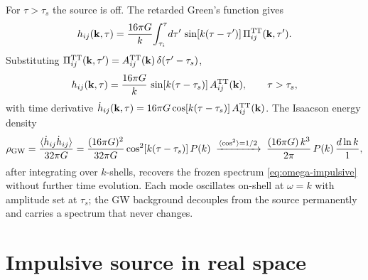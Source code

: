 \documentclass[10pt,prd,aps,nobibnotes,superscriptaddress,preprintnumbers,notitlepage]{revtex4-1}
\newcommand{\kb}{{\bf k}}
\begin{document}
For $\tau>\tau_s$ the source is off. The retarded Green's function gives
\begin{equation}
  h_{ij}(\kb,\tau)
  = \frac{16\pi G}{k}\!\int_{\tau_i}^{\tau}\!d\tau'\,
    \sin[k(\tau-\tau')]\,\Pi^{\rm TT}_{ij}(\kb,\tau').
  \label{eq:greens-impulsive}
\end{equation}
Substituting $\Pi^{\rm TT}_{ij}(\kb,\tau')=A^{\rm TT}_{ij}(\kb)\,\delta(\tau'-\tau_s)$,
\begin{equation}
  h_{ij}(\kb,\tau) = \frac{16\pi G}{k}\,\sin[k(\tau-\tau_s)]\,A^{\rm TT}_{ij}(\kb),
  \qquad \tau>\tau_s,
  \label{eq:impulsive-h}
\end{equation}
with time derivative
$\dot h_{ij}(\kb,\tau)=16\pi G\cos[k(\tau-\tau_s)]\,A^{\rm TT}_{ij}(\kb)$.
The Isaacson energy density
\begin{equation}
  \rho_{\rm GW} = \frac{\langle\dot h_{ij}\dot h_{ij}\rangle}{32\pi G}
  = \frac{(16\pi G)^2}{32\pi G}\cos^2[k(\tau-\tau_s)]\,P(k)
  \;\xrightarrow{\langle\cos^2\rangle=1/2}\;
  \frac{(16\pi G)\,k^3}{2\pi}\,P(k)\,\frac{d\ln k}{1},
  \label{eq:rho-impulsive}
\end{equation}
after integrating over $k$-shells, recovers the frozen spectrum
\eqref{eq:omega-impulsive} without further time evolution. Each mode oscillates
on-shell at $\omega=k$ with amplitude set at $\tau_s$; the GW background
decouples from the source permanently and carries a spectrum that never changes.
\section{Impulsive source in real space}
\label{sec:impulsive-realspace}
\end{document}
